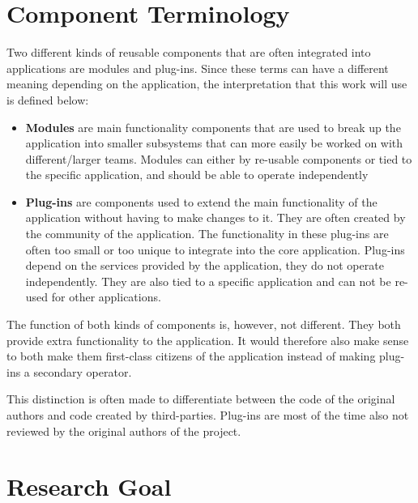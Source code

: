 \newpage

\section{Component Terminology} %

Two different kinds of reusable components that are often integrated into applications are modules and plug-ins. Since these terms can have a different meaning depending on the application, the interpretation that this work will use is defined below:

\begin{itemize}
	\item \textbf{Modules} are main functionality components that are used to break up the application into smaller subsystems that can more easily be worked on with different/larger teams. Modules can either by re-usable components or tied to the specific application, and should be able to operate independently
	\item 
	\textbf{Plug-ins} are components used to extend the main functionality of the application without having to make changes to it. They are often created by the community of the application. The functionality in these plug-ins are often too small or too unique to integrate into the core application. Plug-ins depend on the services provided by the application, they do not operate independently. They are also tied to a specific application and can not be re-used for other applications.
\end{itemize}

\noindent The function of both kinds of components is, however, not different. They both provide extra functionality to the application. It would therefore also make sense to both make them first-class citizens of the application instead of making plug-ins a secondary operator.

This distinction is often made to differentiate between the code of the original authors and code created by third-parties. Plug-ins are most of the time also not reviewed by the original authors of the project.

\section{Research Goal}

